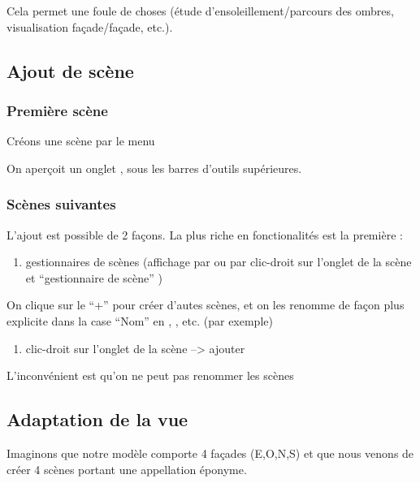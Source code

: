 \documentclass[a4paper,12pt,french]{sphinxmanual}
\begin{document}
Cela permet une foule de choses (étude d'ensoleillement/parcours des ombres, visualisation façade/façade, etc.).


\subsection{Ajout de scène}
\label{su/creation-scenes:ajout-de-scene}

\subsubsection{Première scène}
\label{su/creation-scenes:premiere-scene}
Créons une scène par le menu 

On aperçoit un onglet , sous les barres d'outils supérieures.


\subsubsection{Scènes suivantes}
\label{su/creation-scenes:scenes-suivantes}
L'ajout est possible de 2 façons. La plus riche en fonctionalités est la première :
\begin{enumerate}
\item {} 
gestionnaires de scènes (affichage par  ou par clic-droit sur l'onglet de la scène et ``gestionnaire de scène'' )

\end{enumerate}
\begin{figure}[htbp]
\centering

\noindent{}
\end{figure}

On clique sur le ``+'' pour créer d'autes scènes, et on les renomme de façon plus explicite dans la case ``Nom'' en , , etc. (par exemple)
\begin{enumerate}
\item {} 
clic-droit sur l'onglet de la scène --\textgreater{} ajouter

\end{enumerate}

L'inconvénient est qu'on ne peut pas renommer les scènes


\subsection{Adaptation de la vue}
\label{su/creation-scenes:adaptation-de-la-vue}
Imaginons que notre modèle comporte 4 façades (E,O,N,S) et que nous venons de créer 4 scènes portant une appellation éponyme.
\end{document}
